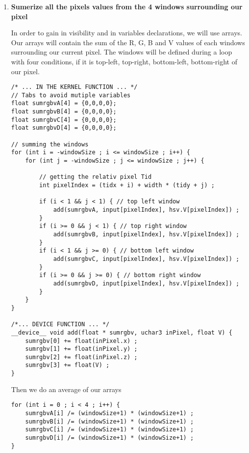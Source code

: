 \documentclass{article}
\begin{document}
    \begin{enumerate}     

    \item \textbf{Sumerize all the pixels values from the 4 windows surrounding our pixel}
    
    In order to gain in visibility and in variables declarations, we will use arrays. Our arrays will contain the sum of the R, G, B and V values of each windows surrounding our current pixel. 
    The windows will be defined during a loop with four conditions, if it is top-left, top-right, bottom-left, bottom-right of our pixel. 
    
    \begin{verbatim}
/* ... IN THE KERNEL FUNCTION ... */
// Tabs to avoid mutiple variables 
float sumrgbvA[4] = {0,0,0,0};
float sumrgbvB[4] = {0,0,0,0};
float sumrgbvC[4] = {0,0,0,0};
float sumrgbvD[4] = {0,0,0,0};

// summing the windows 
for (int i = -windowSize ; i <= windowSize ; i++) {
    for (int j = -windowSize ; j <= windowSize ; j++) {
    
        // getting the relativ pixel Tid
        int pixelIndex = (tidx + i) + width * (tidy + j) ;
        
        if (i < 1 && j < 1) { // top left window
            add(sumrgbvA, input[pixelIndex], hsv.V[pixelIndex]) ;
        }
        if (i >= 0 && j < 1) { // top right window 
            add(sumrgbvB, input[pixelIndex], hsv.V[pixelIndex]) ;
        }
        if (i < 1 && j >= 0) { // bottom left window
            add(sumrgbvC, input[pixelIndex], hsv.V[pixelIndex]) ;
        }
        if (i >= 0 && j >= 0) { // bottom right window 
            add(sumrgbvD, input[pixelIndex], hsv.V[pixelIndex]) ;
        }			
    }
}

/*... DEVICE FUNCTION ... */
__device__ void add(float * sumrgbv, uchar3 inPixel, float V) {
    sumrgbv[0] += float(inPixel.x) ; 
    sumrgbv[1] += float(inPixel.y) ; 
    sumrgbv[2] += float(inPixel.z) ; 
    sumrgbv[3] += float(V) ;	
}

    \end{verbatim}
   
    Then we do an average of our arrays

    \begin{verbatim}
for (int i = 0 ; i < 4 ; i++) {
    sumrgbvA[i] /= (windowSize+1) * (windowSize+1) ;
    sumrgbvB[i] /= (windowSize+1) * (windowSize+1) ;
    sumrgbvC[i] /= (windowSize+1) * (windowSize+1) ;
    sumrgbvD[i] /= (windowSize+1) * (windowSize+1) ;
}


\end{verbatim}
\end{enumerate}
\end{document}
